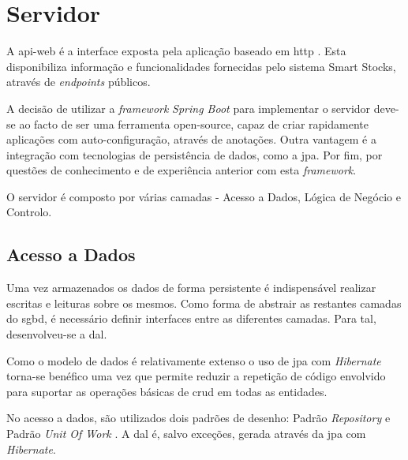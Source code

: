 \section{Servidor}\label{sec32}

A \gls{api-web} é a interface exposta pela aplicação baseado em \acrfull{http} \cite{RFC7231:http}. Esta disponibiliza informação e funcionalidades fornecidas pelo sistema Smart Stocks, através de \textit{endpoints} públicos.

A decisão de utilizar a \textit{framework} \textit{Spring Boot} para implementar o servidor deve-se ao facto de ser uma ferramenta \gls{open-source}, capaz de criar rapidamente aplicações com auto-configuração, através de anotações. Outra vantagem é a integração com tecnologias de persistência de dados, como a \acrfull{jpa}. Por fim, por questões de conhecimento e de experiência anterior com esta \textit{framework}.

O servidor é composto por várias camadas - Acesso a Dados, Lógica de Negócio e Controlo.

%
%
\subsection{Acesso a Dados}\label{subsec321}

Uma vez armazenados os dados de forma persistente é indispensável realizar escritas e leituras sobre os mesmos. Como forma de abstrair as restantes camadas do \acrshort{sgbd}, é necessário definir interfaces entre as diferentes camadas. Para tal, desenvolveu-se a \acrfull{dal}.


Como o modelo de dados é relativamente extenso o uso de \acrfull{jpa} com \textit{Hibernate} torna-se benéfico uma vez que permite reduzir a repetição de código envolvido para suportar as operações básicas de \acrfull{crud} em todas as entidades. 

No acesso a dados, são utilizados dois padrões de desenho: Padrão \textit{Repository} \cite{PofEAARe31:repositoryPattern} e Padrão \textit{Unit Of Work} \cite{PofEAAUn16:unitOfWorkPattern}. A \acrshort{dal} é, salvo exceções, gerada através da \acrshort{jpa} com \textit{Hibernate}.

